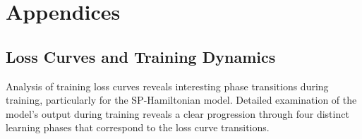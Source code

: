 \chapter{Appendices}








\section{Loss Curves and Training Dynamics}

Analysis of training loss curves reveals interesting phase transitions during training, particularly for the SP-Hamiltonian model. Detailed examination of the model's output during training reveals a clear progression through four distinct learning phases that correspond to the loss curve transitions.

